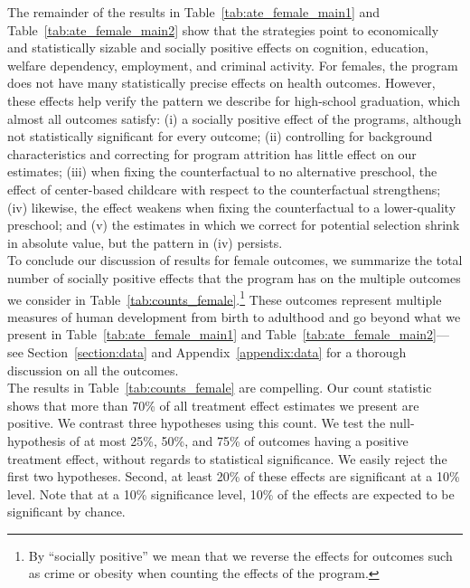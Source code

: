 \noindent The remainder of the results in Table~\ref{tab:ate_female_main1} and Table~\ref{tab:ate_female_main2} show that the strategies point to economically and statistically sizable and socially positive effects on cognition, education, welfare dependency, employment, and criminal activity. For females, the program does not have many statistically precise effects on health outcomes. However, these effects help verify the pattern we describe for high-school graduation, which almost all outcomes satisfy: (i) a socially positive effect of the programs, although not statistically significant for every outcome; (ii) controlling for background characteristics and correcting for program attrition has little effect on our estimates; (iii) when fixing the counterfactual to no alternative preschool, the effect of center-based childcare with respect to the counterfactual strengthens; (iv) likewise, the effect weakens when fixing the counterfactual to a lower-quality preschool; and (v) the estimates in which we correct for potential selection shrink in absolute value, but the pattern in (iv) persists.\\

\noindent To conclude our discussion of results for female outcomes, we summarize the total number of socially positive effects that the program has on the multiple outcomes we consider in Table~\ref{tab:counts_female}.\footnote{By ``socially positive'' we mean that we reverse the effects for outcomes such as crime or obesity when counting the effects of the program.} These outcomes represent multiple measures of human development from birth to adulthood and go beyond what we present in Table~\ref{tab:ate_female_main1} and Table~\ref{tab:ate_female_main2}---see Section~\ref{section:data} and Appendix~\ref{appendix:data} for a thorough discussion on all the outcomes.\\ 

\noindent The results in Table~\ref{tab:counts_female} are compelling. Our count statistic shows that more than 70\% of all treatment effect estimates we present are positive. We contrast three hypotheses using this count. We test the null-hypothesis of at most 25\%, 50\%, and 75\% of outcomes having a positive treatment effect, without regards to statistical significance. We easily reject the first two hypotheses. Second, at least 20\% of these effects are significant at a 10\% level. Note that at a 10\% significance level, 10\% of the effects are expected to be significant by chance.\\

